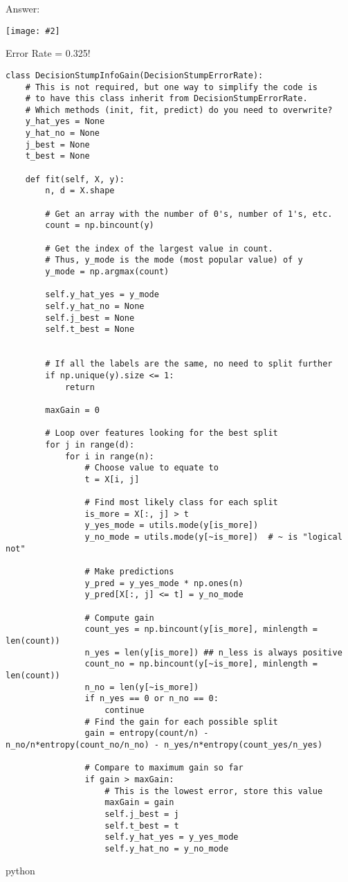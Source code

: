 \documentclass{article}
\newenvironment{answer}{\par\begingroup\color{gre}Answer: }{\endgroup}
\newcommand{\centerfig}[2]{\begin{center}\texttt{[image: \#2]}\end{center}}
\begin{document}
  \begin{answer}
\centerfig{0.7}{./figs/DecisionStumpInfoGain_decisionBoundary}
    Error Rate = 0.325!
    \begin{verbatim}
class DecisionStumpInfoGain(DecisionStumpErrorRate):
    # This is not required, but one way to simplify the code is
    # to have this class inherit from DecisionStumpErrorRate.
    # Which methods (init, fit, predict) do you need to overwrite?
    y_hat_yes = None
    y_hat_no = None
    j_best = None
    t_best = None

    def fit(self, X, y):
        n, d = X.shape

        # Get an array with the number of 0's, number of 1's, etc.
        count = np.bincount(y)

        # Get the index of the largest value in count.
        # Thus, y_mode is the mode (most popular value) of y
        y_mode = np.argmax(count)

        self.y_hat_yes = y_mode
        self.y_hat_no = None
        self.j_best = None
        self.t_best = None


        # If all the labels are the same, no need to split further
        if np.unique(y).size <= 1:
            return

        maxGain = 0

        # Loop over features looking for the best split
        for j in range(d):
            for i in range(n):
                # Choose value to equate to
                t = X[i, j]

                # Find most likely class for each split
                is_more = X[:, j] > t
                y_yes_mode = utils.mode(y[is_more])
                y_no_mode = utils.mode(y[~is_more])  # ~ is "logical not"

                # Make predictions
                y_pred = y_yes_mode * np.ones(n)
                y_pred[X[:, j] <= t] = y_no_mode

                # Compute gain
                count_yes = np.bincount(y[is_more], minlength = len(count))
                n_yes = len(y[is_more]) ## n_less is always positive  
                count_no = np.bincount(y[~is_more], minlength = len(count))
                n_no = len(y[~is_more]) 
                if n_yes == 0 or n_no == 0:
                    continue 
                # Find the gain for each possible split
                gain = entropy(count/n) - n_no/n*entropy(count_no/n_no) - n_yes/n*entropy(count_yes/n_yes)

                # Compare to maximum gain so far
                if gain > maxGain:
                    # This is the lowest error, store this value
                    maxGain = gain
                    self.j_best = j
                    self.t_best = t
                    self.y_hat_yes = y_yes_mode
                    self.y_hat_no = y_no_mode
    \end{verbatim}{python}
\end{answer}
\end{document}
